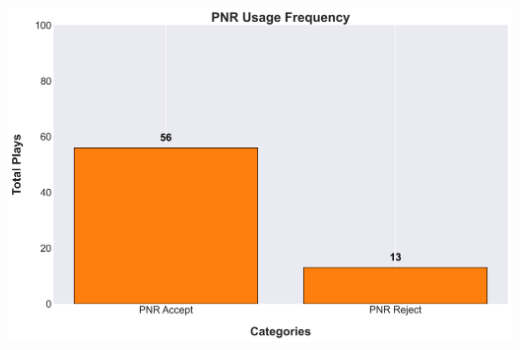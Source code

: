 \documentclass[a4paper,12pt]{article}
\begin{document}
\begin{table}[H]
{\begin{minipage}[t]{0.6\textwidth}
{\begin{tabular}
            

            \bottomrule
        \end{tabular}
        } %
    \end{minipage}
    } %
    \hfill %
    \begin{minipage}[c]{0.35\textwidth} %
        \flushright
        \includegraphics[width=\textwidth, height=.14\textheight]{images/PNR_Usage_Freq.png} %
    \end{minipage}
\end{table}

\vspace{-1em} %
\vspace{-1em} %
\end{document}
